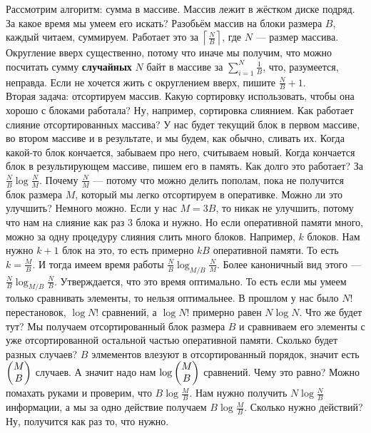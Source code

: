 \documentclass{article}
\begin{document}
    Рассмотрим алгоритм: сумма в массиве. Массив лежит в жёстком диске подряд. За какое время мы умеем его искать? Разобьём массив на блоки размера $B$, каждый читаем, суммируем. Работает это за $\left\lceil\frac NB\right\rceil$, где $N$ --- размер массива. Округление вверх существенно, потому что иначе мы получим, что можно посчитать сумму \textbf{случайных} $N$ байт в массиве за $\sum\limits_{i=1}^N\frac1B$, что, разумеется, неправда. Если не хочется жить с округлением вверх, пишите $\frac NB+1$.\\
    Вторая задача: отсортируем массив. Какую сортировку использовать, чтобы она хорошо с блоками работала? Ну, например, сортировка слиянием. Как работает слияние отсортированных массива? У нас будет текущий блок в первом массиве, во втором массиве и в результате, и мы будем, как обычно, сливать их. Когда какой-то блок кончается, забываем про него, считываем новый. Когда кончается блок в результирующем массиве, пишем его в память. Как долго это работает? За $\frac NB\log\frac NM$. Почему $\frac NM$ --- потому что можно делить пополам, пока не получится блок размера $M$, который мы легко отсортируем в оперативке. Можно ли это улучшить? Немного можно. Если у нас $M=3B$, то никак не улучшить, потому что нам на слияние как раз 3 блока и нужно. Но если оперативной памяти много, можно за одну процедуру слияния слить много блоков. Например, $k$ блоков. Нам нужно $k+1$ блок на это, то есть примерно $kB$ оперативной памяти. То есть $k=\frac MB$. И тогда имеем время работы $\frac NB\log_{M/B}\frac NM$. Более каноничный вид этого --- $\frac NB\log_{M/B}\frac NB$. Утверждается, что это время оптимально. То есть если мы умеем только сравнивать элементы, то нельзя оптимальнее. В прошлом у нас было $N!$ перестановок, $\log N!$ сравнений, а $\log N!$ примерно равен $N\log N$. Что же будет тут? Мы получаем отсортированный блок размера $B$ и сравниваем его элементы с уже отсортированной остальной частью оперативной памяти. Сколько будет разных случаев? $B$ элмементов влезуют в отсортированный порядок, значит есть $\left(\begin{matrix}M\\B\end{matrix}\right)$ случаев. А значит надо нам $\log\left(\begin{matrix}M\\B\end{matrix}\right)$ сравнений. Чему это равно? Можно помахать руками и проверим, что $B\log\frac MB$. Нам нужно получить $N\log\frac NB$ информации, а мы за одно действие получаем $B\log\frac MB$. Сколько нужно действий? Ну, получится как раз то, что нужно.\\
\end{document}

